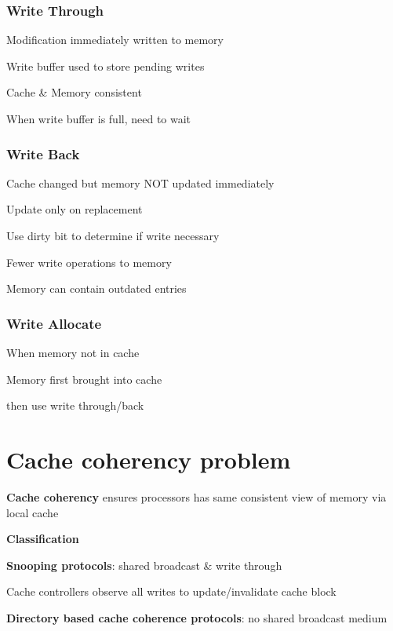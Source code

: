 \documentclass[12pt]{article}
\begin{document}
\begin{spacing}{1.5}
\subsubsection{Write Through}

\begin{itemize*}
	\item Modification immediately written to memory
	\item Write buffer used to store pending writes
	\item Cache \& Memory consistent
	\item When write buffer is full, need to wait
\end{itemize*}

\subsubsection{Write Back}

\begin{itemize*}
	\item Cache changed but memory NOT updated immediately
	\item Update only on replacement
	\item Use dirty bit to determine if write necessary
	\item Fewer write operations to memory
	\item Memory can contain outdated entries
\end{itemize*}

\subsubsection{Write Allocate}

\begin{itemize*}
	\item When memory not in cache
	\item Memory first brought into cache
	\item then use write through/back
\end{itemize*}

\section{Cache coherency problem}

\textbf{Cache coherency} ensures processors has same consistent view of memory via local cache

\textbf{Classification}

\begin{itemize*}
	\item \textbf{Snooping protocols}: shared broadcast \& write through
		\begin{itemize*}
			\item Cache controllers observe all writes to update/invalidate cache block
		\end{itemize*}
	\item \textbf{Directory based cache coherence protocols}: no shared broadcast medium
\end{itemize*}


\end{spacing}
\end{document}
